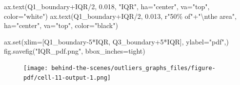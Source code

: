 \documentclass[
  letterpaper,
  DIV=11,
  numbers=noendperiod,
  oneside]{scrreprt}
\newenvironment{Shaded}{\begin{snugshade}}{\end{snugshade}}
\newcommand{\BuiltInTok}[1]{\textcolor[rgb]{0.00,0.23,0.31}{#1}}
\newcommand{\CharTok}[1]{\textcolor[rgb]{0.13,0.47,0.30}{#1}}
\newcommand{\DecValTok}[1]{\textcolor[rgb]{0.68,0.00,0.00}{#1}}
\newcommand{\FloatTok}[1]{\textcolor[rgb]{0.68,0.00,0.00}{#1}}
\newcommand{\NormalTok}[1]{\textcolor[rgb]{0.00,0.23,0.31}{#1}}
\newcommand{\OperatorTok}[1]{\textcolor[rgb]{0.37,0.37,0.37}{#1}}
\newcommand{\SpecialCharTok}[1]{\textcolor[rgb]{0.37,0.37,0.37}{#1}}
\newcommand{\StringTok}[1]{\textcolor[rgb]{0.13,0.47,0.30}{#1}}
\newcommand{\VerbatimStringTok}[1]{\textcolor[rgb]{0.13,0.47,0.30}{#1}}
\begin{document}
\begin{Shaded}
\begin{Highlighting}[]
\NormalTok{ax.text(Q1\_boundary}\OperatorTok{+}\NormalTok{IQR}\OperatorTok{/}\DecValTok{2}\NormalTok{, }\FloatTok{0.018}\NormalTok{, }\StringTok{"IQR"}\NormalTok{,}
\NormalTok{        ha}\OperatorTok{=}\StringTok{"center"}\NormalTok{, va}\OperatorTok{=}\StringTok{"top"}\NormalTok{, color}\OperatorTok{=}\StringTok{"white"}\NormalTok{)}
\NormalTok{ax.text(Q1\_boundary}\OperatorTok{+}\NormalTok{IQR}\OperatorTok{/}\DecValTok{2}\NormalTok{, }\FloatTok{0.013}\NormalTok{, }\VerbatimStringTok{r"50}\SpecialCharTok{\% o}\VerbatimStringTok{f"}\OperatorTok{+}\StringTok{"}\CharTok{\textbackslash{}n}\StringTok{the area"}\NormalTok{,}
\NormalTok{        ha}\OperatorTok{=}\StringTok{"center"}\NormalTok{, va}\OperatorTok{=}\StringTok{"top"}\NormalTok{, color}\OperatorTok{=}\StringTok{"black"}\NormalTok{)}

\NormalTok{ax.}\BuiltInTok{set}\NormalTok{(xlim}\OperatorTok{=}\NormalTok{[Q1\_boundary}\OperatorTok{{-}}\DecValTok{5}\OperatorTok{*}\NormalTok{IQR, Q3\_boundary}\OperatorTok{+}\DecValTok{5}\OperatorTok{*}\NormalTok{IQR],}
\NormalTok{       ylabel}\OperatorTok{=}\StringTok{"pdf"}\NormalTok{,)}
\NormalTok{fig.savefig(}\StringTok{"IQR\_pdf.png"}\NormalTok{, bbox\_inches}\OperatorTok{=}\StringTok{\textquotesingle{}tight\textquotesingle{}}\NormalTok{)}
\end{Highlighting}
\end{Shaded}

\begin{figure}[H]

{\centering \texttt{[image: behind-the-scenes/outliers\_graphs\_files/figure-pdf/cell-11-output-1.png]}

}

\end{figure}
\end{document}
